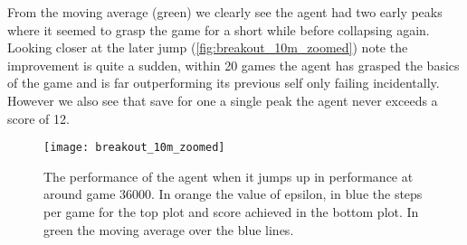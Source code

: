 From the moving average (green) we clearly see the agent had two early peaks where it seemed to grasp the game for a short while before collapsing again. Looking closer at the later jump (\autoref{fig:breakout_10m_zoomed}) note the improvement is quite a sudden, within 20 games the agent has grasped the basics of the game and is far outperforming its previous self only failing incidentally. However we also see that save for one a single peak the agent never exceeds a score of 12.

\begin{figure}
    \texttt{[image: breakout\_10m\_zoomed]}
    \caption{The performance of the agent when it jumps up in performance at around game $36000$. In orange the value of epsilon, in blue the steps per game for the top plot and score achieved in the bottom plot. In green the moving average over the blue lines.}
    \label{fig:breakout_10m_zoomed}
\end{figure}
